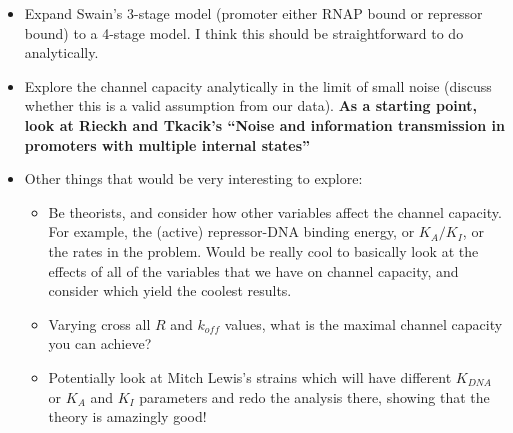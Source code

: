 \begin{itemize}
	\item Expand Swain's 3-stage model (promoter either RNAP bound or repressor bound) to a 4-stage model. I think this should be straightforward to do analytically.
	
	\item Explore the channel capacity analytically in the limit of small noise (discuss whether this is a valid assumption from our data). \textbf{As a starting point, look at Rieckh and Tkacik's ``Noise and information transmission in promoters with multiple internal states''}
	
	\item Other things that would be very interesting to explore:
		\begin{itemize}
			\item Be theorists, and consider how other variables affect the channel capacity. For example, the (active) repressor-DNA binding energy, or $K_A/K_I$, or the rates in the problem. Would be really cool to basically look at the effects of all of the variables that we have on channel capacity, and consider which yield the coolest results.
			\item Varying cross all $R$ and $k_{off}$ values, what is the maximal channel capacity you can achieve?
			\item Potentially look at Mitch Lewis's strains which will have different $K_{DNA}$ or $K_{A}$ and $K_{I}$ parameters and redo the analysis there, showing that the theory is amazingly good!
		\end{itemize}
	

\end{itemize}
